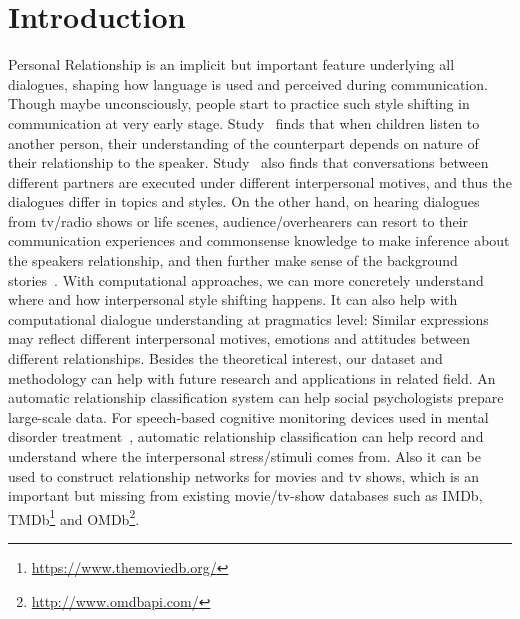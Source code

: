 \section{Introduction}
\label{sec:intro}
Personal Relationship is an implicit but important feature underlying all dialogues, 
shaping how language is used and perceived during communication. 
Though maybe unconsciously, people start to practice such style 
shifting in communication at very early stage. Study~\cite{mind-reading} finds 
that when children listen to another person, their understanding of the 
counterpart depends on nature of their relationship to the speaker.  
Study~\cite{conversational-motive} also finds that conversations between 
different partners are executed under different interpersonal motives, 
and thus the dialogues differ in topics and styles. 
On the other hand, on hearing dialogues from tv/radio shows or life scenes,
audience/overhearers can resort to their communication experiences and commonsense
knowledge to make inference about the speakers relationship, and then further
make sense of the background stories~\cite{FSC}. With computational approaches, we can
more concretely understand where and how interpersonal style shifting happens. It can also help
with computational dialogue understanding at pragmatics level: Similar expressions
may reflect different interpersonal motives, emotions and attitudes between different
relationships. Besides the theoretical interest,
our dataset and methodology can help with future research and applications in related field. 
An automatic relationship classification system can help 
social psychologists prepare large-scale data. For speech-based
cognitive monitoring devices used in mental disorder treatment~\cite{bopolar-monitor, cog-load, tension-monitor}, automatic relationship
classification can help record and understand where the interpersonal stress/stimuli comes from. 
Also it can be used to construct relationship networks for movies and tv shows, 
which is an important but missing from existing movie/tv-show databases 
such as IMDb, TMDb\footnote{\url{https://www.themoviedb.org/}} and 
OMDb\footnote{\url{http://www.omdbapi.com/}}.


